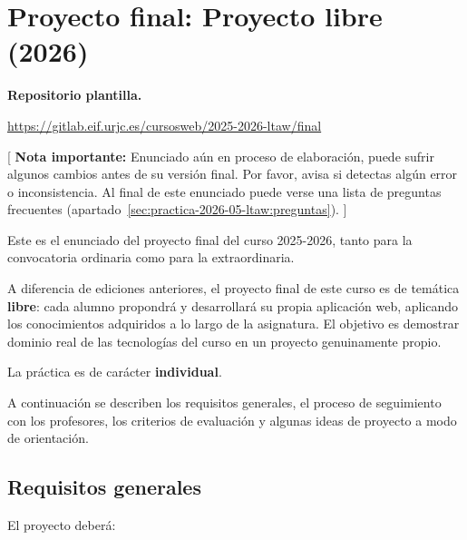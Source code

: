 \section{Proyecto final: Proyecto libre (2026)}
\label{practica-final-2026-05-ltaw}

\textbf{Repositorio plantilla.}

\url{https://gitlab.eif.urjc.es/cursosweb/2025-2026-ltaw/final}

[ \textbf{Nota importante:} Enunciado aún en proceso de elaboración, puede sufrir algunos cambios antes de su versión final. Por favor, avisa si detectas algún error o inconsistencia. Al final de este enunciado puede verse una lista de preguntas frecuentes (apartado~\ref{sec:practica-2026-05-ltaw:preguntas}). ]

Este es el enunciado del proyecto final del curso 2025-2026, tanto para la convocatoria ordinaria como para la extraordinaria.

A diferencia de ediciones anteriores, el proyecto final de este curso es de temática \textbf{libre}: cada alumno propondrá y desarrollará su propia aplicación web, aplicando los conocimientos adquiridos a lo largo de la asignatura. El objetivo es demostrar dominio real de las tecnologías del curso en un proyecto genuinamente propio.

La práctica es de carácter \textbf{individual}.

A continuación se describen los requisitos generales, el proceso de seguimiento con los profesores, los criterios de evaluación y algunas ideas de proyecto a modo de orientación.

\subsection{Requisitos generales}

El proyecto deberá:

